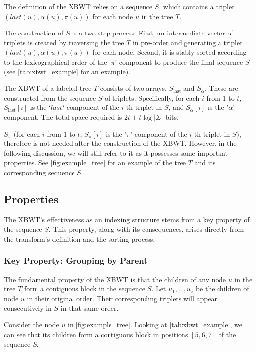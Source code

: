 The definition of the XBWT relies on a sequence $S$, which contains a triplet \\ 
$(last(u), \alpha(u), \pi(u))$ for each node $u$ in the tree $T$.

The construction of $S$ is a two-step process. First, an intermediate vector of triplets is created by traversing the tree $T$ in pre-order and generating a triplet $(last(u), \alpha(u), \pi(u))$ for each node. Second, it is stably sorted according to the lexicographical order of the '$\pi$' component to produce the final sequence $S$ (see \cref{tab:xbwt_example} for an example).

\begin{theorem}
    The XBWT of a labeled tree $T$ consists of two arrays, $S_{\text{last}}$ and $S_{\alpha}$. These are constructed from the sequence $S$ of triplets. Specifically, for each $i$ from 1 to $t$, $S_{\text{last}}[i]$ is the `$last$` component of the $i$-th triplet in $S$, and $S_{\alpha}[i]$ is the '$\alpha$' component. The total space required is $2t + t \log |\Sigma|$ bits.
\end{theorem}

$S_{\pi}$ (for each $i$ from 1 to $t$, $S_{\pi}[i]$ is the '$\pi$' component of the $i$-th triplet in $S$), therefore is not needed after the construction of the XBWT. However, in the following discussion, we will still refer to it as it possesses some important properties. See \cref{fig:example_tree} for an example of the tree $T$ and its corresponding sequence $S$.

\subsection{Properties}
The XBWT's effectiveness as an indexing structure stems from a key property of the sequence $S$. This property, along with its consequences, arises directly from the transform's definition and the sorting process.

\subsubsection{Key Property: Grouping by Parent}

The fundamental property of the XBWT is that the children of any node $u$ in the tree $T$ form a contiguous block in the sequence $S$. Let $u_1, \dots, u_z$ be the children of node $u$ in their original order. Their corresponding triplets will appear consecutively in $S$ in that same order.
\begin{example}
    Consider the node $u$ in \cref{fig:example_tree}. Looking at \cref{tab:xbwt_example}, we can see that its children form a contiguous block in positions $[5, 6, 7]$ of the sequence $S$.
\end{example}

